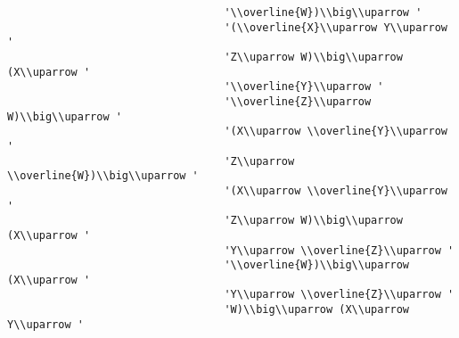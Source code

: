 \begin{verbatim}
                                  '\\overline{W})\\big\\uparrow '
                                  '(\\overline{X}\\uparrow Y\\uparrow '
                                  'Z\\uparrow W)\\big\\uparrow (X\\uparrow '
                                  '\\overline{Y}\\uparrow '
                                  '\\overline{Z}\\uparrow W)\\big\\uparrow '
                                  '(X\\uparrow \\overline{Y}\\uparrow '
                                  'Z\\uparrow \\overline{W})\\big\\uparrow '
                                  '(X\\uparrow \\overline{Y}\\uparrow '
                                  'Z\\uparrow W)\\big\\uparrow (X\\uparrow '
                                  'Y\\uparrow \\overline{Z}\\uparrow '
                                  '\\overline{W})\\big\\uparrow (X\\uparrow '
                                  'Y\\uparrow \\overline{Z}\\uparrow '
                                  'W)\\big\\uparrow (X\\uparrow Y\\uparrow '

\end{verbatim}
